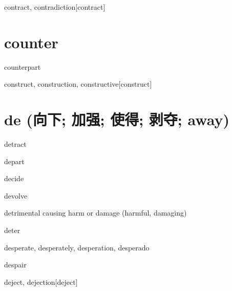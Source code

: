 \begin{DefWord}{contract, contradiction}[contract]
\end{DefWord}

\section{counter}

\begin{RefWord}{counterpart}
\end{RefWord}

\begin{RefWord}{construct, construction, constructive}[construct]
\end{RefWord}



\section{de (向下; 加强; 使得; 剥夺; away)}

\begin{RefWord}{detract}
\end{RefWord}

\begin{RefWord}{depart}
\end{RefWord}

\begin{RefWord}{decide}
\end{RefWord}

\begin{RefWord}{devolve}
\end{RefWord}

\begin{RefWord}{detrimental}
    causing harm or damage (harmful, damaging)
\end{RefWord}

\begin{RefWord}{deter}
\end{RefWord}

\begin{RefWord}{desperate, desperately, desperation, desperado}
\end{RefWord}

\begin{RefWord}{despair}
\end{RefWord}

\begin{RefWord}{deject, dejection}[deject]
\end{RefWord}

